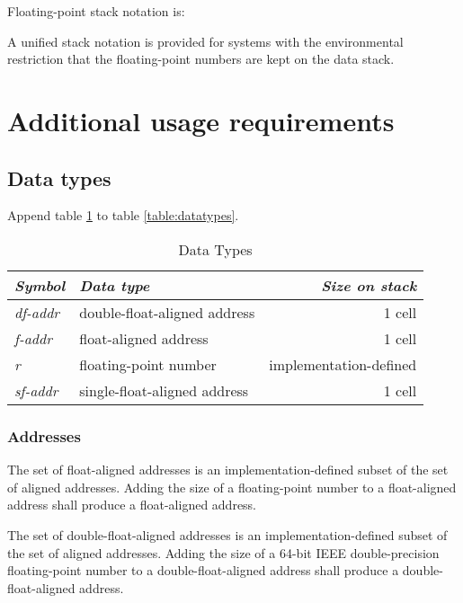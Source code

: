Floating-point stack notation is:
\begin{quote}
\end{quote}

A unified stack notation is provided for systems with the environmental
restriction that the floating-point numbers are kept on the data stack.

\section{Additional usage requirements} %

\subsection{Data types} %
\label{float:datatypes}

Append table \ref{float:types} to table \ref{table:datatypes}.

\begin{table}[ht]
  \begin{center}
	\caption{Data Types}
	\label{float:types}
	\begin{tabular}{llr}
	\hline\hline
	\emph{Symbol} & \emph{Data type} & \emph{Size on stack} \\
	\hline
	\emph{df-addr}	& double-float-aligned address	& 1 cell \\
	\emph{f-addr}	& float-aligned address			& 1 cell \\
	\emph{r}		& floating-point number			& implementation-defined \\
	\emph{sf-addr}	& single-float-aligned address	& 1 cell \\
	\hline\hline
	\end{tabular}
  \end{center}
\end{table}

\subsubsection{Addresses} %
\label{float:addr}

The set of float-aligned addresses is an implementation-defined
subset of the set of aligned addresses. Adding the size of a
floating-point number to a float-aligned address shall produce
a float-aligned address.

The set of double-float-aligned addresses is an implementation-defined
subset of the set of aligned addresses. Adding the size of a 64-bit
IEEE double-precision floating-point number to a double-float-aligned
address shall produce a double-float-aligned address.

